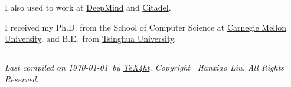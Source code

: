 \documentclass{article}
\begin{document}
\noindent I also used to work at \href{https://deepmind.com/}{DeepMind} and \href{https://www.citadel.com/}{Citadel}.

\noindent I received my Ph.D. from
the School of Computer Science at
\href{http://www.cmu.edu/index.shtml}{Carnegie Mellon University},
and B.E.\ from
\href{https://en.wikipedia.org/wiki/Tsinghua_University}{Tsinghua University}.

\subsection*{}
\footnotesize{
    \textit{
        Last compiled on \today\ by \href{http://www.tug.org/tex4ht/}{\TeX4ht}. \newline
        Copyright \the\year\ Hanxiao Liu. All Rights Reserved.
    }
}
\end{document}
